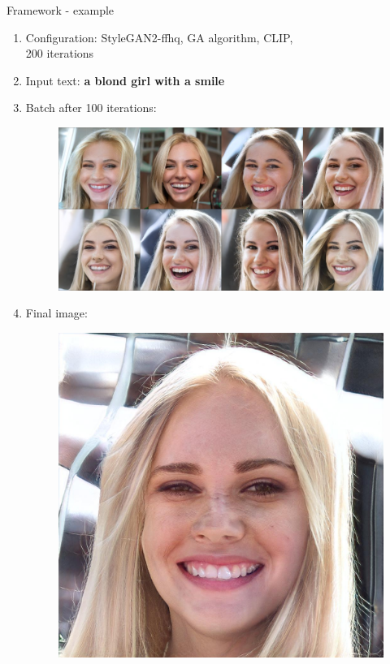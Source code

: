 \documentclass[t]{beamer}
\begin{document}
\begin{frame}[c]{Framework - example}

\begin{enumerate}
\item  Configuration: StyleGAN2-ffhq, GA algorithm, CLIP,  \\200 iterations
\item Input text: \textbf{a blond girl with a smile}
\item Batch after 100 iterations:
\begin{figure}[ht!]
    \centering
    \includegraphics[scale=0.15]{blondgirl.PNG}
\end{figure}
\item Final image:
\begin{figure}[ht!]
    \centering
    \includegraphics[scale=0.07]{result_blond.jpeg}
\end{figure}
\end{enumerate}
\end{frame}
\end{document}
